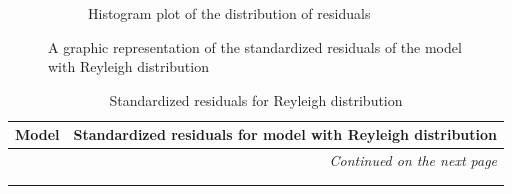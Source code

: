 \documentclass[12pt,a4paper,twoside]{article}
\begin{document}
\begin{figure}[!ht]
\begin{subfigure}{.45\textwidth}
        \caption{Histogram plot of the distribution of residuals}
        \label{fig:reyleighstandardizedhist}
    \end{subfigure}
    \caption{A graphic representation of the standardized residuals of the model with Reyleigh distribution}
    \label{fig:reyleighstandardizedfig}
\end{figure}

\begin{longtable}{l|p{}|p{}}
	\textbf{Model} & \multicolumn{2}{r}{Standardized residuals for model with Reyleigh distribution} \\
	\hline
	\endhead
	\hline
	\multicolumn{3}{r}{\emph{Continued on the next page}}    \\
	\endfoot
	\hline
	\endlastfoot
	\hline
	 &  &  \\
	 \caption{Standardized residuals for Reyleigh distribution}
	 \label{tab:reyleighstandardizedtab}
\end{longtable}
\end{document}
